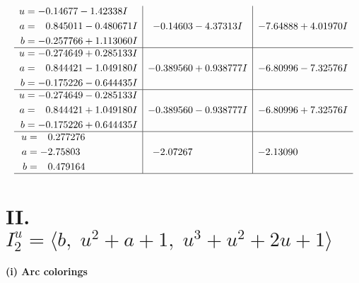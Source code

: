 \documentclass[1p]{elsarticle_modified}
\theoremstyle{definition}
\begin{document}
$$\begin{array}{c|c|c}
\begin{aligned}
u &= -0.14677 - 1.42338 I \\
a &= \phantom{-}0.845011 - 0.480671 I \\
b &= -0.257766 + 1.113060 I\end{aligned}
 & -0.14603 - 4.37313 I & -7.64888 + 4.01970 I \\ \hline\begin{aligned}
u &= -0.274649 + 0.285133 I \\
a &= \phantom{-}0.844421 - 1.049180 I \\
b &= -0.175226 - 0.644435 I\end{aligned}
 & -0.389560 + 0.938777 I & -6.80996 - 7.32576 I \\ \hline\begin{aligned}
u &= -0.274649 - 0.285133 I \\
a &= \phantom{-}0.844421 + 1.049180 I \\
b &= -0.175226 + 0.644435 I\end{aligned}
 & -0.389560 - 0.938777 I & -6.80996 + 7.32576 I \\ \hline\begin{aligned}
u &= \phantom{-}0.277276\phantom{ +0.000000I} \\
a &= -2.75803\phantom{ +0.000000I} \\
b &= \phantom{-}0.479164\phantom{ +0.000000I}\end{aligned}
 & -2.07267\phantom{ +0.000000I} & -2.13090\phantom{ +0.000000I}\\
 \hline 
 \end{array}$$\newpage\newpage\renewcommand{\arraystretch}{1}
\centering \section*{II. $I^u_{2}= \langle b,\;u^2+a+1,\;u^3+u^2+2 u+1 \rangle$}
\flushleft \textbf{(i) Arc colorings}\\
\end{document}
